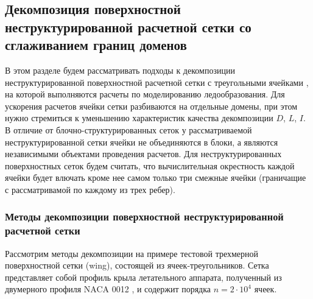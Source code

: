 
\subsection{Декомпозиция поверхностной неструктурированной расчетной сетки со сглаживанием границ доменов}

В этом разделе будем рассматривать подходы к декомпозиции неструктурированной поверхностной расчетной сетки с треугольными ячейками \cite{Rybakov2020Decomp}, на которой выполняются расчеты по моделированию ледообразования.
Для ускорения расчетов ячейки сетки разбиваются на отдельные домены, при этом нужно стремиться к уменьшению характеристик качества декомпозиции $D$, $L$, $I$.
В отличие от блочно-структурированных сеток у рассматриваемой неструктурированной сетки ячейки не объединяются в блоки, а являются независимыми объектами проведения расчетов.
Для неструктурированных поверхностных сеток будем считать, что вычислительная окрестность каждой ячейки будет влючать кроме нее самом только три смежные ячейки (граничащие с рассматривамой по каждому из трех ребер).

\subsubsection{Методы декомпозиции поверхностной \mbox{неструктурированной} расчетной сетки}\label{sec:par_decompsurf_methods}

Рассмотрим методы декомпозиции на примере тестовой трехмерной поверхностной сетки (wing), состоящей из ячеек-треугольников.
Сетка представляет собой профиль крыла летательного аппарата, полученный из двумерного профиля NACA 0012 \cite{Naca0012}, и содержит порядка $n = 2 \cdot 10^4$ ячеек.

